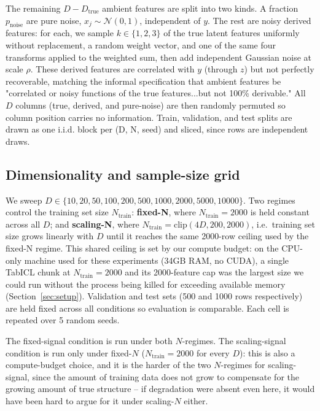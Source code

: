 \documentclass{article}
\begin{document}
The remaining $D - D_{\text{true}}$ ambient features are split into two kinds. A
fraction $p_{\text{noise}}$ are pure noise, $x_j \sim \mathcal{N}(0,1)$, independent of
$y$. The rest are noisy derived features: for each, we sample $k \in \{1,2,3\}$ of the
true latent features uniformly without replacement, a random weight vector, and one of
the same four transforms applied to the weighted sum, then add independent Gaussian
noise at scale $\rho$. These derived features are correlated with $y$ (through $z$) but
not perfectly recoverable, matching the informal specification that ambient features be
"correlated or noisy functions of the true features...but not 100\% derivable." All $D$
columns (true, derived, and pure-noise) are then randomly permuted so column position
carries no information. Train, validation, and test splits are drawn as one i.i.d.
block per (D, N, seed) and sliced, since rows are independent draws.

\subsection{Dimensionality and sample-size grid}
\label{sec:grid}

We sweep $D \in \{10, 20, 50, 100, 200, 500, 1000, 2000, 5000, 10000\}$. Two regimes
control the training set size $N_{\text{train}}$: \textbf{fixed-N}, where
$N_{\text{train}}=2000$ is held constant across all $D$; and \textbf{scaling-N}, where
$N_{\text{train}} = \text{clip}(4D, 200, 2000)$, i.e.\ training set size grows linearly
with $D$ until it reaches the same 2000-row ceiling used by the fixed-N regime. This
shared ceiling is set by our compute budget: on the CPU-only machine used for these
experiments (34GB RAM, no CUDA), a single TabICL chunk at $N_{\text{train}}=2000$ and
its 2000-feature cap was the largest size we could run without the process being
killed for exceeding available memory (Section~\ref{sec:setup}). Validation and test
sets (500 and 1000 rows respectively) are held fixed across all conditions so
evaluation is comparable. Each cell is repeated over 5 random seeds.

The fixed-signal condition is run under both $N$-regimes. The scaling-signal
condition is run only under fixed-$N$ ($N_{\text{train}}=2000$ for every $D$): this is
also a compute-budget choice, and it is the harder of the two $N$-regimes for
scaling-signal, since the amount of training data does not grow to compensate for the
growing amount of true structure -- if degradation were absent even here, it would
have been hard to argue for it under scaling-$N$ either.
\end{document}
